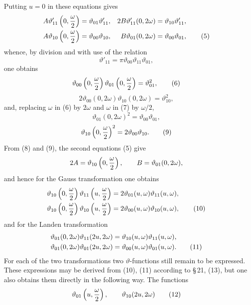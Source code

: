 \documentclass[11pt]{article}
\providecommand{\tht}{\vartheta}
\begin{document}
Putting $u=0$ in these equations gives
\begin{align}
A\tht'_{11}\left(0,{\omega\over2}\right)&=\tht_{01}\tht'_{11},&
2B\tht'_{11}(0,2\omega)&=\tht_{10}\tht'_{11},\notag\\
A\tht_{10}\left(0,{\omega\over2}\right)&=\tht_{00}\tht_{10},&
B\tht_{01}(0,2\omega)&=\tht_{00}\tht_{01}, \tag{5}
\end{align}
whence, by division and with use of the relation
\[
\tht'_{11}=\pi\tht_{00}\tht_{11}\tht_{01},
\]
one obtains
\begin{equation}
\tht_{00}\left(0,{\omega\over2}\right)\tht_{01}\left(0,{\omega\over2}\right)=\tht_{01}^2, \tag{6}
\end{equation}
\begin{equation}
2\tht_{00}(0,2\omega)\tht_{10}(0,2\omega)=\tht_{10}^2, \tag{7}
\end{equation}
and, replacing $\omega$ in (6) by $2\omega$ and $\omega$ in (7) by $\omega/2$,
\begin{equation}
\tht_{01}(0,2\omega)^2=\tht_{00}\tht_{01}, \tag{8}
\end{equation}
\begin{equation}
\tht_{10}\left(0,{\omega\over2}\right)^2=2\tht_{00}\tht_{10}. \tag{9}
\end{equation}
From (8) and (9), the second equations (5) give
\[
2A=\tht_{10}\left(0,{\omega\over2}\right),\qquad B=\tht_{01}(0,2\omega),
\]
and hence for the Gauss transformation one obtains
\begin{align}
\tht_{10}\left(0,{\omega\over2}\right)\tht_{11}\left(u,{\omega\over2}\right)&=2\tht_{01}(u,\omega)\tht_{11}(u,\omega),\notag\\
\tht_{10}\left(0,{\omega\over2}\right)\tht_{10}\left(u,{\omega\over2}\right)&=2\tht_{00}(u,\omega)\tht_{10}(u,\omega), \tag{10}
\end{align}
and for the Landen transformation
\begin{align}
\tht_{01}(0,2\omega)\tht_{11}(2u,2\omega)&=\tht_{10}(u,\omega)\tht_{11}(u,\omega),\notag\\
\tht_{01}(0,2\omega)\tht_{01}(2u,2\omega)&=\tht_{00}(u,\omega)\tht_{01}(u,\omega). \tag{11}
\end{align}
For each of the two transformations two $\vartheta$-functions still remain to be expressed. These expressions may be derived from (10), (11) according to \S\,21, (13), but one also obtains them directly in the following way. The functions
\begin{equation}
\tht_{01}\left(u,{\omega\over2}\right),\qquad \tht_{10}(2u,2\omega) \tag{12}
\end{equation}
\end{document}

